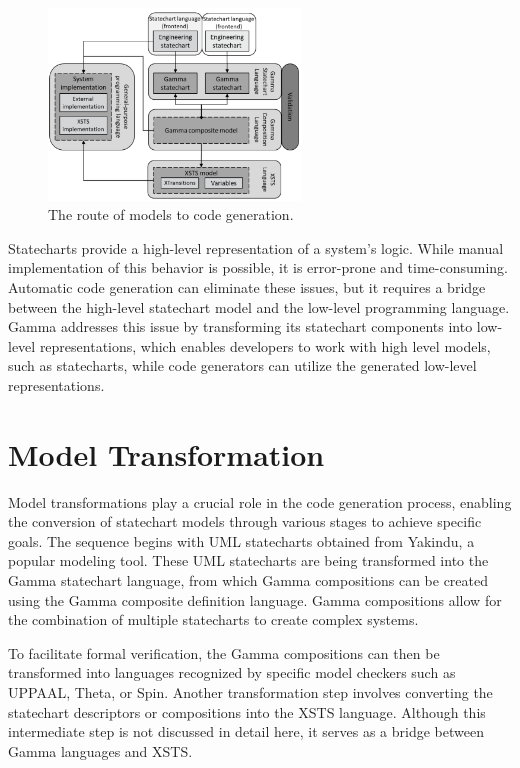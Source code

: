 \begin{figure}[h]
	\centering
	\includegraphics[width=0.6\textwidth]{images/gamma.png}
	\caption{The route of models to code generation.\cite{CPS}}
	\label{fig:gamma}
\end{figure}

Statecharts provide a high-level representation of a system's logic. While manual implementation of this behavior is possible, it is error-prone and time-consuming. Automatic code generation can eliminate these issues, but it requires a bridge between the high-level statechart model and the low-level programming language. Gamma addresses this issue by transforming its statechart components into low-level representations, which enables developers to work with high level models, such as statecharts, while code generators can utilize the generated low-level representations.

\section{Model Transformation}

Model transformations play a crucial role in the code generation process, enabling the conversion of statechart models through various stages to achieve specific goals. The sequence begins with UML statecharts obtained from Yakindu, a popular modeling tool. These UML statecharts are being transformed into the Gamma statechart language, from which Gamma compositions can be created using the Gamma composite definition language. Gamma compositions allow for the combination of multiple statecharts to create complex systems.

To facilitate formal verification, the Gamma compositions can then be transformed into languages recognized by specific model checkers such as UPPAAL, Theta, or Spin. Another transformation step involves converting the statechart descriptors or compositions into the XSTS language. Although this intermediate step is not discussed in detail here, it serves as a bridge between Gamma languages and XSTS.

